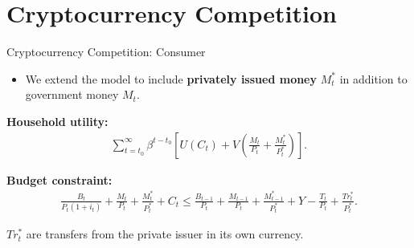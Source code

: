 \documentclass[11pt,aspectratio=169]{beamer}
\begin{document}
\section{Cryptocurrency Competition}

\begin{frame}{Cryptocurrency Competition: Consumer}
\small

\begin{itemize}
    \item We extend the model to include \textbf{privately issued money} $M_t^*$ in addition to government money $M_t$.
\end{itemize}

\vspace{0.5em}

\textbf{Household utility:}
\begin{align*}
\sum_{t=t_0}^{\infty} 
\beta^{t-t_0}
\left[
    U(C_t)
    +
    V\!\left( 
        \frac{M_t}{P_t} + \frac{M_t^*}{P_t^*}
    \right)
\right].
\end{align*}

\vspace{0.4em}

\textbf{Budget constraint:}
\begin{align}
\frac{B_t}{P_t(1+i_t)}
+\frac{M_t}{P_t}
+\frac{M_t^*}{P_t^*}
+C_t
\le
\frac{B_{t-1}}{P_t}
+\frac{M_{t-1}}{P_t}
+\frac{M_{t-1}^*}{P_t^*}
+Y
-\frac{T_t}{P_t}
+\frac{Tr_t^*}{P_t^*}.
\label{2.31}
\end{align}

\vspace{0.4em}

$Tr_t^*$ are transfers from the private issuer in its own currency.
\end{frame}
\end{document}
